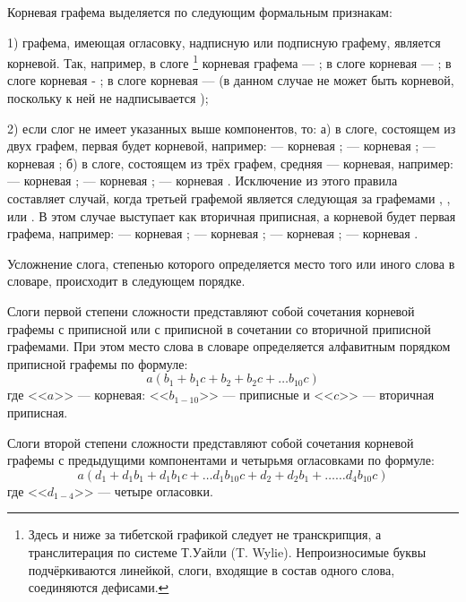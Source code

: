 Корневая графема выделяется по следующим формальным признакам:

1) графема, имеющая огласовку, надписную или подписную графему, является корневой. Так, например, в слоге \footnote[17]{Здесь и ниже за тибетской графикой следует не транскрипция, а транслитерация по системе Т.Уайли (T. Wylie). Непроизносимые буквы подчёркиваются линейкой, слоги, входящие в состав одного слова, соединяются дефисами.} корневая графема --- ; в слоге  корневая --- ; в слоге  корневая - ; в слоге  корневая ---  (в данном случае  не может быть корневой, поскольку к ней не надписывается );

2) если слог не имеет указанных выше компонентов, то: а) в слоге, состоящем из двух графем, первая будет корневой, например:
 --- корневая ;
 --- корневая ;
 --- корневая ;
б) в слоге, состоящем из трёх графем, средняя --- корневая, например:
 --- корневая ;
 --- корневая ;
 --- корневая .
Исключение из этого правила составляет случай, когда третьей графемой является  следующая за графемами , ,  или . В этом случае  выступает как вторичная приписная, а корневой будет первая графема, например:
 --- корневая ;
 --- корневая ;
 --- корневая ;
 --- корневая .

Усложнение слога, степенью которого определяется место того или иного слова в словаре, происходит в следующем порядке.

Слоги первой степени сложности представляют собой сочетания корневой графемы с приписной или с приписной в сочетании со вторичной приписной графемами. При этом место слова в словаре определяется алфавитным порядком приписной графемы по формуле:
\begin{equation*}
a(b_{1} + b_{1}c + b_{2} + b_{2}c + \dots{}b_{10}c)
\end{equation*}
где <<$a$>> --- корневая: <<$b_{1-10}$>> --- приписные и <<$c$>> — вторичная приписная.

Слоги второй степени сложности представляют собой сочетания корневой графемы с предыдущими компонентами и четырьмя огласовками по формуле:
\begin{equation*}
	a(d_{1} + d_{1}b_{1} + d_{1}b_{1}c + \dots{}d_{1}b_{10}c + d_{2} + d_{2}b_{1} + \dots{}\dots{}d_{4}b_{10}c)
\end{equation*}
где <<$d_{1-4}$>> --- четыре огласовки.


